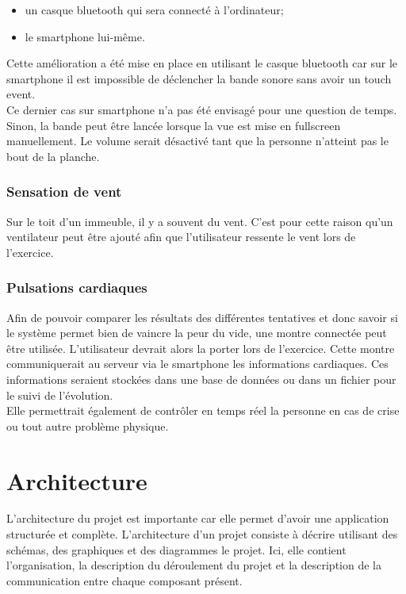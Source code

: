 \begin{itemize}
\item un casque \textsf{bluetooth} qui sera connecté à l'ordinateur;
\item le \textsf{smartphone} lui-même.\\

\end{itemize}

Cette amélioration a été mise en place en utilisant le casque \textsf{bluetooth} car sur le \textsf{smartphone} il est impossible de déclencher la bande sonore sans avoir un \textsf{touch event}. \\
Ce dernier cas  sur \textsf{smartphone} n'a pas été envisagé pour une question de temps. Sinon, la bande peut être lancée lorsque la vue est mise en \textsf{fullscreen} manuellement. Le volume serait désactivé tant que  la personne n'atteint pas le bout de la planche.

\subsubsection{Sensation de vent}
Sur le toit d'un immeuble, il y a souvent du vent. C'est pour cette raison qu'un ventilateur peut être ajouté afin que l'utilisateur ressente le vent lors de l'exercice.

\subsubsection{Pulsations cardiaques}
Afin de pouvoir comparer les résultats des différentes tentatives et donc savoir si le système permet bien de vaincre la peur du vide, une montre connectée peut être utilisée. L'utilisateur devrait alors la porter lors de l'exercice. Cette montre communiquerait au serveur via le \textsf{smartphone} les informations cardiaques. Ces informations seraient stockées dans une base de données ou dans un fichier pour le suivi de l'évolution.\\
Elle permettrait également de contrôler en temps réel la personne en cas de crise ou tout autre problème physique. \\


\pagebreak
\section{Architecture}  \label{architecture}
L'architecture du projet est importante car elle permet d'avoir une application structurée et complète. L'architecture d'un projet consiste à décrire utilisant des schémas, des graphiques et des diagrammes le projet. Ici, elle contient l'organisation, la description du déroulement du projet et la description de la communication entre chaque composant présent. \\
 
